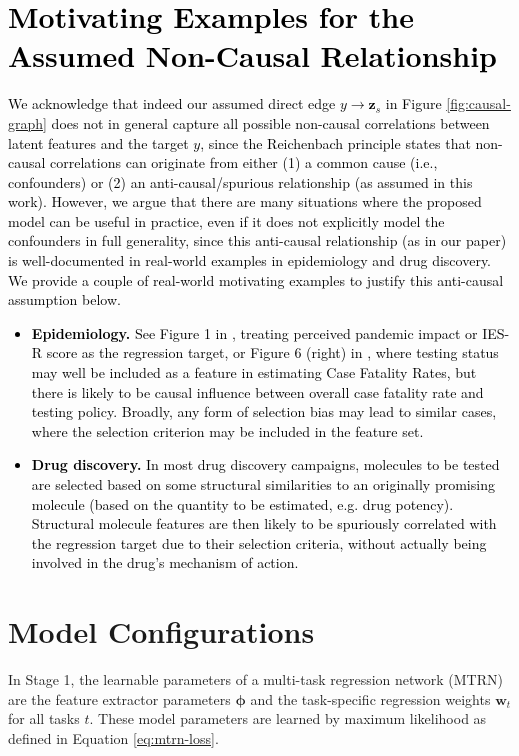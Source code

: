 \documentclass[10pt]{article} %
\theoremstyle{plain}
\theoremstyle{definition}
\begin{document}
\section{\textcolor{black}{Motivating Examples for the Assumed Non-Causal Relationship}}\label{appendix:motivating-examples}
\textcolor{black}{
We acknowledge that indeed our assumed direct edge $y\to \mathbf{z}_s$ in Figure \ref{fig:causal-graph} does not in general capture all possible non-causal correlations between latent features and the target $y$, since the Reichenbach principle states that non-causal correlations can originate from either (1) a common cause (i.e., confounders) or (2) an anti-causal/spurious relationship (as assumed in this work).
}
\textcolor{black}{
However, we argue that there are many situations where the proposed model can be useful in practice, even if it does not explicitly model the confounders in full generality, since this anti-causal relationship (as in our paper) is well-documented in real-world examples in epidemiology and drug discovery. We provide a couple of real-world motivating examples to justify this anti-causal assumption below.}
\textcolor{black}{
\begin{itemize}
    \item \textbf{Epidemiology.} See Figure 1 in \citet{wang2021chain}, treating perceived pandemic impact or IES-R score as the regression target, or Figure 6 (right) in \citet{von2021simpson}, where testing status may well be included as a feature in estimating Case Fatality Rates, but there is likely to be causal influence between overall case fatality rate and testing policy. Broadly, any form of selection bias may lead to similar cases, where the selection criterion may be included in the feature set.
    \item \textbf{Drug discovery.} In most drug discovery campaigns, molecules to be tested are selected based on some structural similarities to an originally promising molecule (based on the quantity to be estimated, e.g. drug potency). Structural molecule features are then likely to be spuriously correlated with the regression target due to their selection criteria, without actually being involved in the drug’s mechanism of action.
\end{itemize}
}

\section{Model Configurations}\label{appendix: model-config}
In Stage 1, the learnable parameters of a multi-task regression network (MTRN) are the feature extractor parameters $\boldsymbol{\phi}$ and the task-specific regression weights $\mathbf{w}_t$ for all tasks $t$. These model parameters are learned by maximum likelihood as defined in Equation \eqref{eq:mtrn-loss}.
\end{document}
